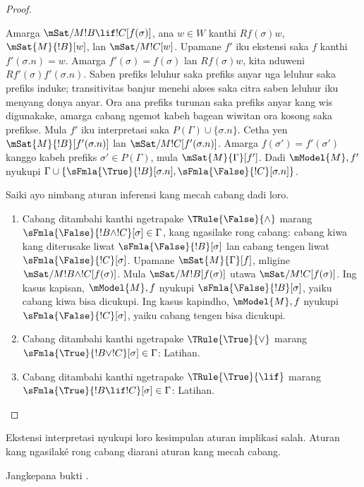 \documentclass[../../../include/open-logic-section]{subfiles}
\begin{document}
\begin{proof}
\begin{enumerate}
  Amarga $\mSat/{M}{!B \lif !C}[f(\sigma)]$, ana $w \in W$ kanthi
  $Rf(\sigma)w$, $\mSat{M}{!B}[w]$, lan $\mSat/{M}{!C}[w]$.
  Upamane $f'$ iku ekstensi saka $f$ kanthi $f'(\sigma.n) = w$.
  Amarga $f'(\sigma) = f(\sigma)$ lan $Rf(\sigma)w$, kita nduweni
  $Rf'(\sigma)f'(\sigma.n)$. Saben prefiks leluhur saka prefiks anyar
  uga leluhur saka prefiks induke; transitivitas banjur menehi
  akses saka citra saben leluhur iku menyang donya anyar. Ora ana
  prefiks turunan saka prefiks anyar kang wis digunakake, amarga
  cabang ngemot kabeh bagean wiwitan ora kosong saka prefikse.
  Mula $f'$ iku interpretasi saka $P(\Gamma) \cup \{\sigma.n\}$.
  Cetha yen $\mSat{M}{!B}[f'(\sigma.n)]$ lan
  $\mSat/{M}{!C}[f'(\sigma.n)]$. Amarga $f(\sigma') = f'(\sigma')$
  kanggo kabeh prefiks $\sigma' \in P(\Gamma)$, mula
  $\mSat{M}{\Gamma}[f']$. Dadi $\mModel{M}, f'$ nyukupi
  $\Gamma \cup \{\sFmla{\True}{!B}[\sigma.n], \sFmla{\False}{!C}[\sigma.n]\}$.
\end{enumerate}
Saiki ayo nimbang aturan inferensi kang mecah cabang dadi loro.
\begin{enumerate}
\item Cabang ditambahi kanthi ngetrapake $\TRule{\False}{\land}$ marang
  $\sFmla{\False}{!B \land !C}[\sigma] \in \Gamma$, kang ngasilake
  rong cabang: cabang kiwa kang diterusake liwat
  $\sFmla{\False}{!B}[\sigma]$ lan cabang tengen liwat
  $\sFmla{\False}{!C}[\sigma]$. Upamane $\mSat{M}{\Gamma}[f]$,
  mligine $\mSat/{M}{!B \land !C}[f(\sigma)]$. Mula
  $\mSat/{M}{!B}[f(\sigma)]$ utawa $\mSat/{M}{!C}[f(\sigma)]$.
  Ing kasus kapisan, $\mModel{M}, f$ nyukupi
  $\sFmla{\False}{!B}[\sigma]$, yaiku cabang kiwa bisa dicukupi.
  Ing kasus kapindho, $\mModel{M}, f$ nyukupi
  $\sFmla{\False}{!C}[\sigma]$, yaiku cabang tengen bisa dicukupi.
\item Cabang ditambahi kanthi ngetrapake $\TRule{\True}{\lor}$ marang
    $\sFmla{\True}{!B \lor !C}[\sigma] \in \Gamma$: Latihan.
\item Cabang ditambahi kanthi ngetrapake $\TRule{\True}{\lif}$ marang
    $\sFmla{\True}{!B \lif !C}[\sigma] \in \Gamma$: Latihan.
\end{enumerate}
\end{proof}
Ekstensi interpretasi nyukupi loro kesimpulan aturan implikasi salah. Aturan kang ngasilaké rong cabang diarani aturan kang mecah cabang.

\begin{prob}
Jangkepana bukti .
\end{prob}
\end{document}

